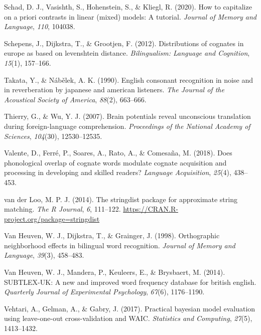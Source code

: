 \documentclass[
  english,
  man,floatsintext]{apa7}
\newlength{\cslhangindent}
\newenvironment{CSLReferences}[2] %
 {%
  \setlength{\parindent}{0pt}
  \ifodd #1 \everypar{\setlength{\hangindent}{\cslhangindent}}\ignorespaces\fi
  \ifnum #2 > 0
  \setlength{\parskip}{#2\baselineskip}
  \fi
 }%
 {}
\begin{document}
\begin{CSLReferences}{1}{0}
\leavevmode{}%
Schad, D. J., Vasishth, S., Hohenstein, S., \& Kliegl, R. (2020). How to capitalize on a priori contrasts in linear (mixed) models: A tutorial. \emph{Journal of Memory and Language}, \emph{110}, 104038.

\leavevmode{}%
Schepens, J., Dijkstra, T., \& Grootjen, F. (2012). Distributions of cognates in europe as based on levenshtein distance. \emph{Bilingualism: Language and Cognition}, \emph{15}(1), 157--166.

\leavevmode{}%
Takata, Y., \& Nábělek, A. K. (1990). English consonant recognition in noise and in reverberation by japanese and american listeners. \emph{The Journal of the Acoustical Society of America}, \emph{88}(2), 663--666.

\leavevmode{}%
Thierry, G., \& Wu, Y. J. (2007). Brain potentials reveal unconscious translation during foreign-language comprehension. \emph{Proceedings of the National Academy of Sciences}, \emph{104}(30), 12530--12535.

\leavevmode{}%
Valente, D., Ferré, P., Soares, A., Rato, A., \& Comesaña, M. (2018). Does phonological overlap of cognate words modulate cognate acquisition and processing in developing and skilled readers? \emph{Language Acquisition}, \emph{25}(4), 438--453.

\leavevmode{}%
van der Loo, M. P. J. (2014). The stringdist package for approximate string matching. \emph{The {R} {J}ournal}, \emph{6}, 111--122. \url{https://CRAN.R-project.org/package=stringdist}

\leavevmode{}%
Van Heuven, W. J., Dijkstra, T., \& Grainger, J. (1998). Orthographic neighborhood effects in bilingual word recognition. \emph{Journal of Memory and Language}, \emph{39}(3), 458--483.

\leavevmode{}%
Van Heuven, W. J., Mandera, P., Keuleers, E., \& Brysbaert, M. (2014). SUBTLEX-UK: A new and improved word frequency database for british english. \emph{Quarterly Journal of Experimental Psychology}, \emph{67}(6), 1176--1190.

\leavevmode{}%
Vehtari, A., Gelman, A., \& Gabry, J. (2017). Practical bayesian model evaluation using leave-one-out cross-validation and WAIC. \emph{Statistics and Computing}, \emph{27}(5), 1413--1432.


\end{CSLReferences}
\end{document}

